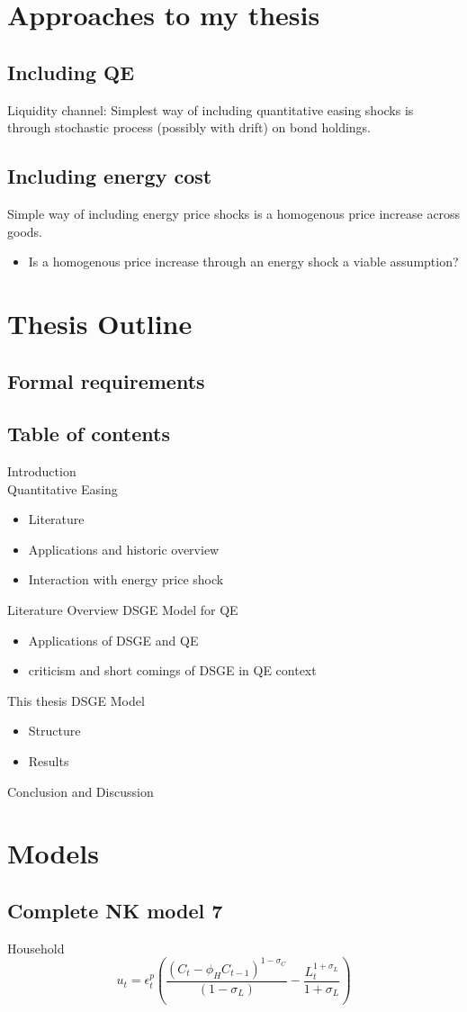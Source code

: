 \documentclass[11pt,a4paper,english]{article} %
\begin{document}
	\section{Approaches to my thesis}
	
	\subsection{Including QE}
	Liquidity channel: Simplest way of including quantitative easing shocks is through stochastic process (possibly with drift) on bond holdings.
	
	\subsection{Including energy cost}
	Simple way of including energy price shocks is a homogenous price increase across goods. 
	\begin{itemize}
		\item Is a homogenous price increase through an energy shock a viable assumption?
	\end{itemize}

	\section{Thesis Outline}
	\subsection{Formal requirements}
	
	\subsection{Table of contents}
	Introduction\\
	Quantitative Easing
	\begin{itemize}
		\item Literature
		\item Applications and historic overview
		\item Interaction with energy price shock
	\end{itemize}
	Literature Overview DSGE Model for QE
	\begin{itemize}
		\item Applications of DSGE and QE
		\item criticism and short comings of DSGE in QE context
	\end{itemize}
	This thesis DSGE Model
	\begin{itemize}
		\item Structure
		\item Results
	\end{itemize}
	Conclusion and Discussion
	
	\section{Models}
	\subsection{Complete NK model 7}
	Household \\
	\[
		u_t = \epsilon_{t} ^ p (\frac{(C_t - \phi_H C_{t-1})^{1 - \sigma_C}}{(1 - \sigma_L)} - \frac{L_t^{1 + \sigma_L}}{1 + \sigma_L})
		
	\]
	
\end{document}
